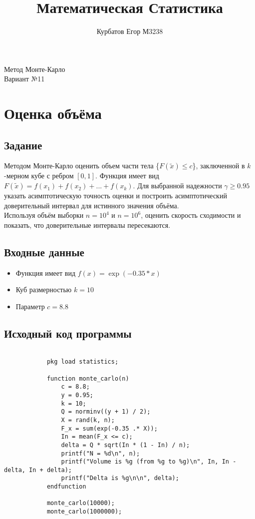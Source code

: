\documentclass{article}
\title{Математическая Статистика}
\author{Курбатов Егор М3238}
\begin{document}
\maketitle
\begin{center}
    Метод Монте-Карло \\
    Вариант №11
\end{center}

\section{Оценка объёма}
    \subsection{Задание}
        Методом Монте-Карло оценить объем части тела \{$F(\tilde x) \leq c$\}, заключенной в $k$-мерном кубе с ребром $[0, 1]$. 
        Функция имеет вид $F(\tilde x) = f(x_1) + f(x_2) + ... + f(x_k)$.
        Для выбранной надежности $\gamma \geq 0.95$ указать асимптотическую точность оценки и построить асимптотический доверительный интервал для истинного значения объёма. \\
        Используя объём выборки $n = 10^4$ и $n = 10^6$, оценить скорость сходимости и показать, что доверительные интервалы пересекаются.
    \subsection{Входные данные}
        \begin{itemize}
            \item Функция имеет вид $f(x) = \exp(-0.35*x)$
            \item Куб размерностью $k = 10$
            \item Параметр $c = 8.8$ 
        \end{itemize}
    \subsection{Исходный код программы}
        \begin{minipage}{\linewidth}
            \begin{verbatim}
            
            pkg load statistics;

            function monte_carlo(n)
                c = 8.8;
                y = 0.95;
                k = 10; 
                Q = norminv((y + 1) / 2);
                X = rand(k, n);
                F_x = sum(exp(-0.35 .* X));
                In = mean(F_x <= c);
                delta = Q * sqrt(In * (1 - In) / n);
                printf("N = %d\n", n);
                printf("Volume is %g (from %g to %g)\n", In, In - delta, In + delta);
                printf("Delta is %g\n\n", delta); 
            endfunction

            monte_carlo(10000);
            monte_carlo(1000000);
            
            \end{verbatim}
        \end{minipage}
\end{document}
